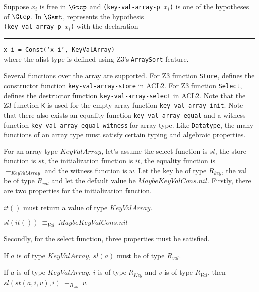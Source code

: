Suppose $x_i$ is free in $\Gtcp$ and \texttt{(key-val-array-p $x_i$)} is one of
the hypotheses of $\Gtcp$. In $\Gsmt$, \smtlink{} represents the hypothesis \\
\texttt{(key-val-array-p $x_i$)} with the declaration\\
\rule{2em}{0ex}\texttt{x\_i = Const('x\_i', KeyValArray)}\\
where the alist type is defined using Z3's \texttt{ArraySort} feature.

Several functions over the array are supported.
For Z3 function \texttt{Store}, \smtlink{} defines the constructor function
\texttt{key-val-array-store} in ACL2. For Z3 function \texttt{Select},
\smtlink{} defines the destructor function \texttt{key-val-array-select} in
ACL2.
Note that the Z3 function \texttt{K} is used for the empty array function
\texttt{key-val-array-init}.
Note that there also exists an equality function
\texttt{key-val-array-equal} and a witness function
\texttt{key-val-array-equal-witness} for array type. Like \texttt{Datatype}, the
many functions of an array type must satisfy certain typing and algebraic
properties.


For an array type $KeyValArray$, let's assume the select function is
$sl$, the store function is $st$, the initialization function
is $it$, the equality function is $\equiv_{KeyValArray}$ and the witness function
is $w$. Let the key be of type $R_{key}$, the val be of type $R_{val}$ and let
the default value be $MaybeKeyValCons.nil$.
Firstly, there are two properties for the initialization function.
\begin{property}
  $it()$ must return a value of type $KeyValArray$.
\end{property}

\begin{property}
  $sl(it())\: \equiv_{Val}\: MaybeKeyValCons.nil$
\end{property}

\noindent Secondly, for the select function, three properties must be satisfied.
\begin{property}
  If $a$ is of type $KeyValArray$, $sl(a)$ must be of type $R_{val}$.
\end{property}

\begin{property}
  If $a$ is of type $KeyValArray$, $i$ is of type $R_{Key}$ and $v$ is of type
  $R_{Val}$, then $sl(st(a, i, v), i)\: \equiv_{R_{Val}}\: v$.
\end{property}

